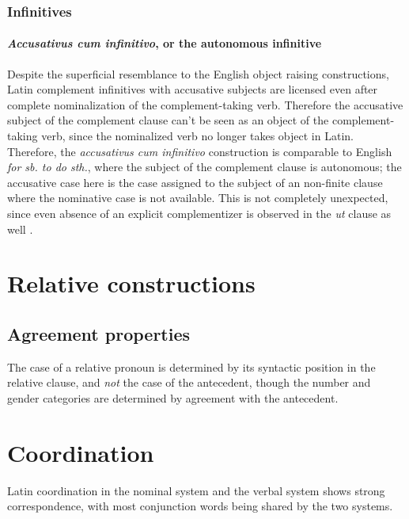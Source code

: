 \documentclass[a4paper, oneside, 12pt]{report}
\newcommand*{\citepages}[1]{pp.~{#1}}
\newcommand{\form}[1]{\emph{#1}}
\begin{document}
\subsection{Infinitives}

\subsubsection{\form{Accusativus cum infinitivo}, or the autonomous infinitive}

Despite the superficial resemblance to the English object raising constructions,
Latin complement infinitives with accusative subjects 
are licensed even after complete nominalization
of the complement-taking verb.
Therefore the accusative subject of the complement clause 
can't be seen as an object of the complement-taking verb, 
since the nominalized verb no longer takes object in Latin.
Therefore, the \form{accusativus cum infinitivo} construction 
is comparable to English \form{for sb. to do sth.},
where the subject of the complement clause is autonomous;
the accusative case here is the case assigned to 
the subject of an non-finite clause where the nominative case is not available.
This is not completely unexpected, 
since even absence of an explicit complementizer 
is observed in the \form{ut} clause as well
\citep[\citepages{290-292}]{oniga2014latin}.

\chapter{Relative constructions}\label{chap:relative-clause}

\section{Agreement properties}\label{sec:relative-clause.overview.agreement}

The case of a relative pronoun is determined 
by its syntactic position in the relative clause, 
and \emph{not} the case of the antecedent,
though the number and gender categories 
are determined by agreement with the antecedent.

\chapter{Coordination}

Latin coordination in the nominal system and the verbal system 
shows strong correspondence,
with most conjunction words being shared
by the two systems.
\end{document}
